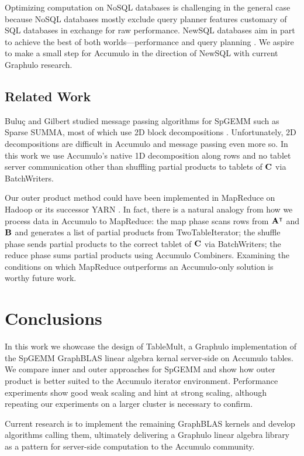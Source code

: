 Optimizing computation on NoSQL databases is challenging in the general case because
NoSQL databases mostly exclude query planner features 
customary of SQL databases in exchange for raw performance.
NewSQL databases aim in part to achieve the best of both worlds---performance and query planning \cite{grolinger2013data}.
We aspire to make a small step for Accumulo in the direction of NewSQL with current Graphulo research.



\subsection{Related Work} %
Bulu\c{c} and Gilbert studied message passing algorithms for SpGEMM
such as Sparse SUMMA, most of which use 2D block decompositions \cite{buluc2012parallel}.
Unfortunately, 2D decompositions are difficult in Accumulo 
and message passing even more so.
In this work we use Accumulo's native 1D decomposition along rows 
and no tablet server communication
other than shuffling partial products to tablets of $\mathbf{C}$ via BatchWriters.


Our outer product method could have been implemented in MapReduce %
on Hadoop or its successor YARN \cite{vavilapalli2013apache}.
In fact, there is a natural analogy from how we process data in Accumulo to MapReduce:
the map phase scans rows from $\mathbf{A^{\intercal}}$ and $\mathbf{B}$
and generates a list of partial products from TwoTableIterator;
the shuffle phase sends partial products to the correct tablet of $\mathbf{C}$ via BatchWriters;
the reduce phase sums partial products using Accumulo Combiners.
Examining the conditions on which MapReduce outperforms an Accumulo-only solution
is worthy future work.




\section{Conclusions}
\label{sConclusions}

In this work we showcase the design of TableMult, a Graphulo implementation of the 
SpGEMM GraphBLAS linear algebra kernal server-side on Accumulo tables.
We compare inner and outer approaches for SpGEMM and show how outer product is better
suited to the Accumulo iterator environment.
Performance experiments show good weak scaling and hint at strong scaling,
although repeating our experiments on a larger cluster is necessary to confirm.

Current research is to implement the remaining GraphBLAS kernels 
and develop algorithms calling them, %
ultimately delivering a Graphulo linear algebra library 
as a pattern for server-side computation
to the Accumulo community.
